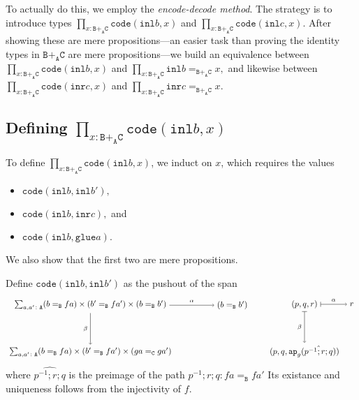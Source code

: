 \message{ !name(notes.tex)}\documentclass[12pt]{amsart}
\newcommand{\inv}{^{-1}}
\newcommand{\type}[1]{\mathtt{#1}}
\newcommand{\tin}{\colon}
\newcommand{\A}{\type{A}}
\newcommand{\B}{\type{B}}
\newcommand{\C}{\type{C}}
\newcommand{\BAC}{\B +_{\A} \C}
\newcommand{\ap}{\type{ap}}
\newcommand{\inl}{\type{inl}}
\newcommand{\inr}{\type{inr}}
\newcommand{\glue}{\type{glue}}
\newcommand{\code}{\type{code}}
\theoremstyle{remark}
\theoremstyle{definition}
\begin{document}
To actually do this, we employ the \textit{encode-decode method}. The
strategy is to introduce types
%
\(
   \prod\limits_{ x \tin \BAC} \code ( \inl b , x )
\)
%
and
%
\(
   \prod\limits_{ x \tin \BAC } \code ( \inl c , x ).
\)
%
After showing these are mere propositions---an easier task than
proving the identity types in \( \BAC \) are mere propositions---we build
an equivalence between
%
\(
   \prod\limits_{ x \tin \BAC } \code ( \inl b , x )
\)
%
and
%
\(
   \prod\limits_{ x \tin \BAC } \inl b =_{\BAC} x,
\)
% 
and likewise between
%
\(
   \prod\limits_{ x \tin \BAC } \code ( \inr c , x )
\)
%
and
%
\(
   \prod\limits_{ x \tin \BAC } \inr c =_{\BAC} x.
\)


\subsection{Defining \( \prod\limits_{x \tin \BAC} \code ( \inl b , x ) \)} 
\label{sec:define-code-bx}

To define \( \prod\limits_{ x \tin \BAC } \code ( \inl b , x ) \), we
induct on \( x \), which requires the values
%
\begin{itemize}
\item
  \(
      \code ( \inl b ,\inl b' ),
  \)
\item
  \(
      \code ( \inl b , \inr c ),
  \)
  and
\item
  \(
      \code ( \inl b , \glue a ).
  \)
\end{itemize}
%
We also show that the first two are mere propositions.  

Define
\(
    \code ( \inl b , \inl b' )
\)
as the pushout of the span
%
\[
\begin{tikzpicture}
	\node (1) at (0,2) 
		{ $ \sum_{ a , a' \tin \A } 
			( b =_\B fa ) 
			\times ( b' =_\B fa' ) 
			\times ( b =_\B b' ) $ };
	\node (2) at (6,2) 
		{ $ ( b =_\B b' ) $ };
	\node (3) at (0,0) 
		{ $ \sum_{ a , a' \tin \A } 
			( b =_\B fa ) 
			\times  (b' =_\B fa') 
			\times ( ga =_\C ga' ) $ };
	\draw [ -> ] (1) to 
		node [above] {\scriptsize $ \alpha $} 
		(2);
	\draw [ -> ] (1) to 
		node [left] {\scriptsize $ \beta $}
		(3);
\end{tikzpicture}
\quad \quad 
\begin{tikzpicture}
	\node (1) at (0,2) { \( ( p,q,r )  \) };
	\node (2) at (2,2) { \( r \) };
	\node (3) at (0,0) { \( ( p,q, \ap_g (\hat{p\inv ; r ; q})) \)};
        \draw [ |-> ]
          (1) to 
	  node [above] {\scriptsize $ \alpha $} 
	  (2);
        \draw [ |-> ]
          (1) to 
	  node [left] {\scriptsize $ \beta $}
	  (3);
\end{tikzpicture}
\]
%
where
\(
    \hat{p\inv ; r ; q}
\)
is the preimage of the path
%
\(
    p\inv ; r ; q \tin
    fa =_{\B} fa'
\)
% 
Its existance and uniqueness follows from
the injectivity of \( f \).
\par
\end{document}
